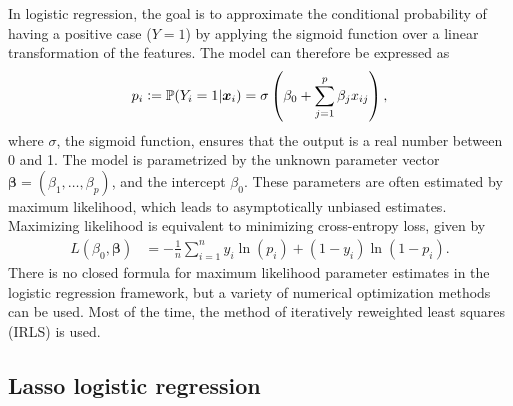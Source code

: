 \documentclass{article}
\newcommand{\Prr}[1]{\mathbb{P}\! \left( #1 \right)}
\newcommand{\defeq}{\vcentcolon=}
\begin{document}
In logistic regression, the goal is to approximate the conditional probability of having a positive case ($Y = 1$) by applying the sigmoid function over a linear transformation of the features. The model can therefore be expressed as
\begin{align}
    p_i \defeq \Prr{Y_i = 1|\boldsymbol{x}_i} = \sigma\left(\beta_0 + \sum_{j = 1}^p \beta_j x_{ij}\right),
    \label{eq:predictionlasso}
\end{align}
where $\sigma$, the sigmoid function, ensures that the output is a real number between 0 and 1. The model is parametrized by the unknown parameter vector $\boldsymbol{\beta} = (\beta_1, \dots, \beta_p)$, and the intercept $\beta_0$. These parameters are often estimated by maximum likelihood, which leads to asymptotically unbiased estimates. Maximizing likelihood is equivalent to minimizing cross-entropy loss, given by
\begin{align}
    L(\beta_0, \boldsymbol{\beta}) &= -\frac{1}{n} \sum_{i = 1}^n y_i \ln(p_i) + (1 - y_i) \ln(1 - p_i).
    \label{eq:crossentropyloss}
\end{align}
There is no closed formula for maximum likelihood parameter estimates in the logistic regression framework, but a variety of numerical optimization methods can be used. Most of the time, the method of iteratively reweighted least squares (IRLS) is used. 

\subsection{Lasso logistic regression}
\end{document}
